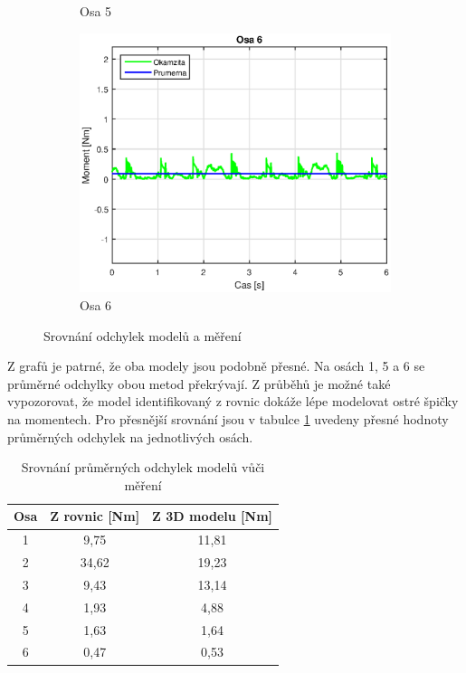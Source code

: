 \begin{figure}
\begin{subfigure}[b]{0.7\textwidth}
        \caption{Osa 5}
        \label{osa_5_odch_pic}
    \end{subfigure}
    \begin{subfigure}[b]{0.7\textwidth}
        \includegraphics[width=\textwidth]{Osa_6_odch}
        \caption{Osa 6}
        \label{osa_6_odch_pic}
    \end{subfigure}
    \caption{Srovnání odchylek modelů a měření}\label{osy_odch_pic}
\end{figure}

\clearpage

Z grafů je patrné, že oba modely jsou podobně přesné. Na osách 1, 5 a 6 se průměrné odchylky obou metod překrývají. Z průběhů je možné také vypozorovat, že model identifikovaný z rovnic dokáže lépe modelovat ostré špičky na momentech. Pro přesnější srovnání jsou v tabulce \ref{tab_srov_odch} uvedeny přesné hodnoty průměrných odchylek na jednotlivých osách.

\hfill
\begin{table}[htbp]
  \centering
  \caption{Srovnání průměrných odchylek modelů vůči měření}
    \begin{tabular}{c|c|c}
       Osa   & \multicolumn{1}{c|}{Z rovnic [Nm]} & \multicolumn{1}{c}{Z 3D modelu [Nm]} \\
    \hline
    1     & 9,75 & 11,81  \\
    2     & 34,62 & 19,23 \\
    3     & 9,43 & 13,14  \\
    4     & 1,93 & 4,88   \\
    5     & 1,63 & 1,64   \\
    6     & 0,47 & 0,53   \\
    \end{tabular}%
  \label{tab_srov_odch}%
\end{table}%

